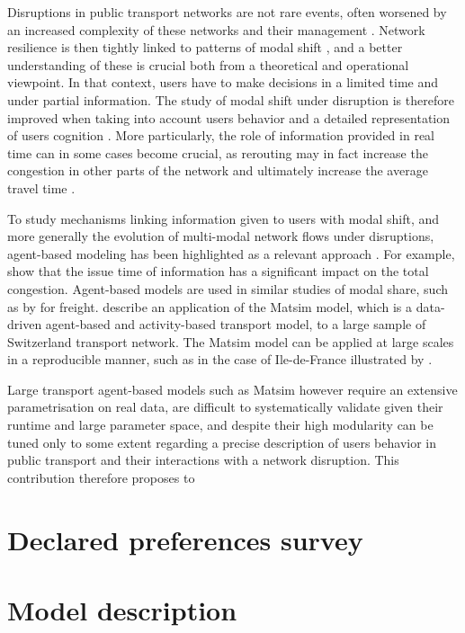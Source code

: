 \documentclass[3p,times,procedia]{elsarticle}
\begin{document}
Disruptions in public transport networks are not rare events, often worsened by an increased complexity of these networks and their management \citep{dekker2018next}. Network resilience is then tightly linked to patterns of modal shift \cite{stamos2015impact}, and a better understanding of these is crucial both from a theoretical and operational viewpoint. In that context, users have to make decisions in a limited time and under partial information. The study of modal shift under disruption is therefore improved when taking into account users behavior and a detailed representation of users cognition \citep{brisbois2010processus}. More particularly, the role of information provided in real time can in some cases become crucial, as rerouting may in fact increase the congestion in other parts of the network and ultimately increase the average travel time \citep{chatterjee2002driver,chorus2006travel}.

To study mechanisms linking information given to users with modal shift, and more generally the evolution of multi-modal network flows under disruptions, agent-based modeling has been highlighted as a relevant approach \citep{leng2020role}. For example, \cite{leng2020issue} show that the issue time of information has a significant impact on the total congestion. Agent-based models are used in similar studies of modal share, such as by \cite{baindur2011agent} for freight. \cite{raney2003agent} describe an application of the Matsim model, which is a data-driven agent-based and activity-based transport model, to a large sample of Switzerland transport network. The Matsim model can be applied at large scales in a reproducible manner, such as in the case of Ile-de-France illustrated by \cite{horl2020reproducible}.

Large transport agent-based models such as Matsim however require an extensive parametrisation on real data, are difficult to systematically validate given their runtime and large parameter space, and despite their high modularity can be tuned only to some extent regarding a precise description of users behavior in public transport and their interactions with a network disruption. This contribution therefore proposes to 




\section{Declared preferences survey}


\section{Model description}
\end{document}
